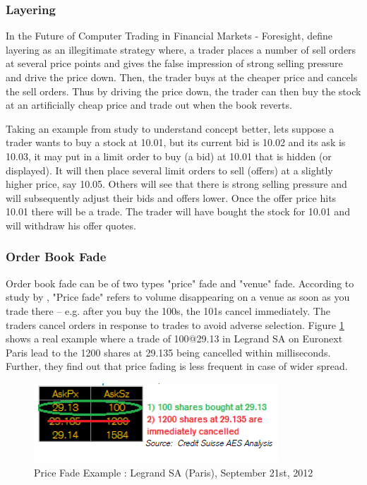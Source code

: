 \documentclass[12pt,a4paper]{article}
\numberwithin{equation}{section}
\numberwithin{figure}{section}
\numberwithin{table}{section}
\begin{document}
\subsubsection{Layering}
In the Future of Computer Trading in Financial Markets - Foresight, \citet{brogaard2011} define layering as an illegitimate strategy where, a trader places a number of sell orders at several price points and gives the false impression of strong selling pressure and drive the price down. Then, the trader buys at the cheaper price and cancels the sell orders. Thus by driving the price down, the trader can then buy the stock at an artificially cheap price and trade out when the book reverts.

Taking an example from \citet{brogaard2011} study to understand concept better, lets suppose a trader wants to buy a stock at 10.01, but its current bid is 10.02 and its ask is 10.03, it may put in a limit order to buy (a bid) at 10.01 that is hidden (or displayed). It will then place several limit orders to sell (offers) at a slightly higher price, say 10.05. Others will see that  there is strong selling pressure and will subsequently adjust their bids and offers lower. Once the  offer price hits 10.01 there will be a trade. The trader will have bought the stock for 10.01 and will withdraw his offer quotes.

\subsubsection{Order Book Fade}
Order book fade can be of two types "price" fade and "venue" fade. According to study by \citet{AES2012II}, "Price fade" refers to volume disappearing on a venue as soon as you trade there – e.g. after you buy the 100s, the 101s cancel immediately. The traders cancel orders in response to trades to avoid adverse selection. Figure \ref{fig:PF} shows a real example where a trade of 100@29.13 in Legrand SA on Euronext Paris lead to the 1200 shares at 29.135 being cancelled within milliseconds. Further, they find out that price fading is less frequent in case of wider spread. 
\begin{figure}[ht]
\begin{center}
\includegraphics[width=\textwidth]{PF}
\caption{Price Fade Example : Legrand SA (Paris), September 21st, 2012 \citep{AES2012II}}
\label{fig:PF}
\end{center}
\end{figure}
\end{document}
